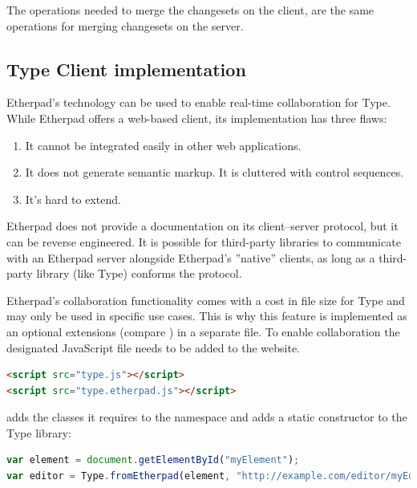 The operations needed to merge the changesets on the client, are the same operations for merging changesets on the server.

\subsection{Type Client implementation}
\label{subsec:etherpad_type_client_implementation}

Etherpad's technology can be used to enable real-time collaboration for Type. While Etherpad offers a web-based client, its implementation has three flaws:

\begin{enumerate}
\item It cannot be integrated easily in other web applications.
\item It does not generate semantic markup. It is cluttered with control sequences.
\item It's hard to extend.
\end{enumerate}

Etherpad does not provide a documentation on its client--server protocol, but it can be reverse engineered. It is possible for third-party libraries to communicate with an Etherpad server alongside Etherpad's ''native'' clients, as long as a third-party library (like Type) conforms the protocol.

Etherpad's collaboration functionality comes with a cost in file size for Type and may only be used in specific use cases. This is why this feature is implemented as an optional extensions (compare ) in a separate file. To enable collaboration the designated JavaScript file needs to be added to the website.

\begin{lstlisting}[language=html, caption=Enabling real-time collaboration to Type, label=lst:add_etherpad_html]
<script src="type.js"></script>
<script src="type.etherpad.js"></script>
\end{lstlisting}

 adds the classes it requires to the  namespace and adds a static constructor to the Type library:

\begin{lstlisting}[language=JavaScript, caption=Static constructor to generate a collaborative Type instance, label=lst:etherpad_constructor]
var element = document.getElementById("myElement");
var editor = Type.fromEtherpad(element, "http://example.com/editor/myEditorId");
\end{lstlisting}

